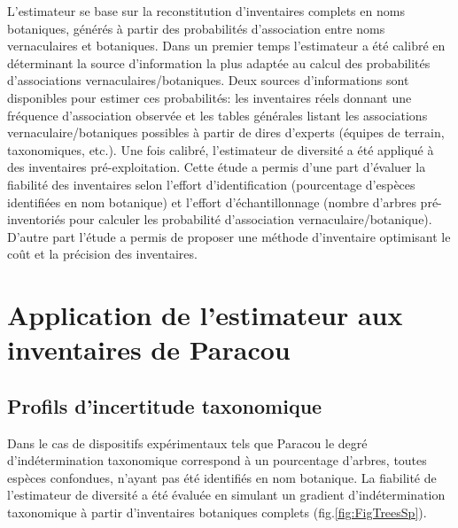 \documentclass[
  11pt,
  french,
  A4paper,
  extrafontsizes,onecolumn,openright
  ]{memoir}
\begin{document}
L'estimateur se base sur la reconstitution d'inventaires complets en
noms botaniques, générés à partir des probabilités d'association entre
noms vernaculaires et botaniques. Dans un premier temps l'estimateur a
été calibré en déterminant la source d'information la plus adaptée au
calcul des probabilités d'associations vernaculaires/botaniques. Deux
sources d'informations sont disponibles pour estimer ces probabilités:
les inventaires réels donnant une fréquence d'association observée et
les tables générales listant les associations vernaculaire/botaniques
possibles à partir de dires d'experts (équipes de terrain, taxonomiques,
etc.). Une fois calibré, l'estimateur de diversité a été appliqué à des
inventaires pré-exploitation. Cette étude a permis d'une part d'évaluer
la fiabilité des inventaires selon l'effort d'identification
(pourcentage d'espèces identifiées en nom botanique) et l'effort
d'échantillonnage (nombre d'arbres pré-inventoriés pour calculer les
probabilité d'association vernaculaire/botanique). D'autre part l'étude
a permis de proposer une méthode d'inventaire optimisant le coût et la
précision des inventaires.

\section{Application de l'estimateur aux inventaires de
Paracou}\label{application-de-lestimateur-aux-inventaires-de-paracou}

\subsection{Profils d'incertitude
taxonomique}\label{profils-dincertitude-taxonomique}

Dans le cas de dispositifs expérimentaux tels que Paracou le degré
d'indétermination taxonomique correspond à un pourcentage d'arbres,
toutes espèces confondues, n'ayant pas été identifiés en nom botanique.
La fiabilité de l'estimateur de diversité a été évaluée en simulant un
gradient d'indétermination taxonomique à partir d'inventaires botaniques
complets (fig.\ref{fig:FigTreesSp}).
\end{document}
